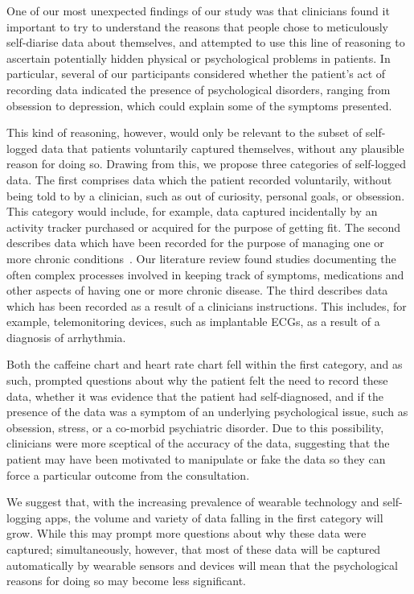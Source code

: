 \documentclass{sigchi}
\begin{document}
One of our most unexpected findings of our study was that clinicians found it important to try to understand the reasons that people chose to meticulously self-diarise data about themselves, and attempted to use this line of reasoning to ascertain potentially hidden physical or psychological problems in patients. In particular, several of our participants considered whether the patient's act of recording data indicated the presence of psychological disorders, ranging from obsession to depression, which could explain some of the symptoms presented. 

This kind of reasoning, however, would only be relevant to the subset of self-logged data that patients voluntarily captured themselves, without any plausible reason for doing so.  Drawing from this, we propose three categories of self-logged data. The first comprises data which the patient recorded voluntarily, without being told to by a clinician, such as out of curiosity, personal goals, or obsession. This category would include, for example, data captured incidentally by an activity tracker purchased or acquired for the purpose of getting fit. The second describes data which have been recorded for the purpose of managing one or more chronic conditions~\cite{ancker_invisible_2015}.  Our literature review found studies documenting the often complex processes involved in keeping track of symptoms, medications and other aspects of having one or more chronic disease. The third describes data which has been recorded as a result of a clinicians instructions. This includes, for example, telemonitoring devices, such as implantable ECGs, as a result of a diagnosis of arrhythmia.

Both the caffeine chart and heart rate chart fell within the first category, and as such, prompted questions about why the patient felt the need to record these data, whether it was evidence that the patient had self-diagnosed, and if the presence of the data was a symptom of an underlying psychological issue, such as obsession, stress, or a co-morbid psychiatric disorder. Due to this possibility, clinicians were more sceptical of the accuracy of the data, suggesting that the patient may have been motivated to manipulate or fake the data so they can force a particular outcome from the consultation.

We suggest that, with the increasing prevalence of wearable technology and self-logging apps, the volume and variety of data falling in the first category will grow.  While this may prompt more questions about why these data were captured; simultaneously, however, that most of these data will be captured automatically by wearable sensors and devices will mean that the psychological reasons for doing so may become less significant.
\end{document}
